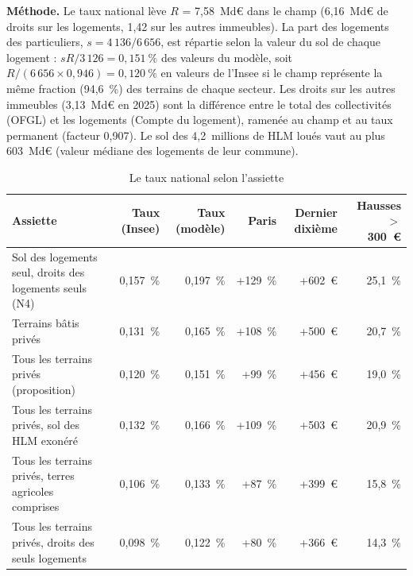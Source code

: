 \textbf{Méthode.} Le taux national lève $R$ = 7,58~Md€ dans le champ (6,16~Md€ de droits sur les logements, 1,42 sur
les autres immeubles). La part des logements des particuliers, $s = 4\,136/6\,656$, est répartie selon la valeur du sol de
chaque logement : $sR/3\,126 = 0,151~\%$ des valeurs du modèle, soit $R/(6\,656 \times 0,946) = 0,120~\%$ en valeurs de
l'Insee si le champ représente la même fraction (94,6~\%) des terrains de chaque secteur. Les droits sur les autres
immeubles (3,13~Md€ en 2025) sont la différence entre le total des collectivités (OFGL) et les logements (Compte du
logement), ramenée au champ et au taux permanent (facteur 0,907). Le sol des 4,2~millions de HLM loués vaut au plus
603~Md€ (valeur médiane des logements de leur commune).

\begin{table}[!htbp]\centering\scriptsize
\caption{Le taux national selon l'assiette}\label{tab:fon_sens}
\begin{tabularx}{\linewidth}{@{}>{\raggedright\arraybackslash}X rrrrr@{}}
\toprule
Assiette & Taux (Insee) & Taux (modèle) & Paris & Dernier dixième & Hausses $>$ 300~€ \\
\midrule
Sol des logements seul, droits des logements seuls (N4) & 0,157~\% & 0,197~\% & +129~\% & +602~€ & 25,1~\% \\
Terrains bâtis privés & 0,131~\% & 0,165~\% & +108~\% & +500~€ & 20,7~\% \\
Tous les terrains privés (proposition) & 0,120~\% & 0,151~\% & +99~\% & +456~€ & 19,0~\% \\
Tous les terrains privés, sol des HLM exonéré & 0,132~\% & 0,166~\% & +109~\% & +503~€ & 20,9~\% \\
Tous les terrains privés, terres agricoles comprises & 0,106~\% & 0,133~\% & +87~\% & +399~€ & 15,8~\% \\
Tous les terrains privés, droits des seuls logements & 0,098~\% & 0,122~\% & +80~\% & +366~€ & 14,3~\% \\
\bottomrule
\end{tabularx}
\par\vspace{2pt}{\raggedright\scriptsize Variation moyenne de la taxe des logements à Paris et dans le dixième le plus
cher ; sans réaction des ventes (avec 6~\% de ventes en plus par point, environ 18~\% de moins). Les terres agricoles
sont déjà soumises à la taxe sur le foncier non bâti.\par}
\end{table}


